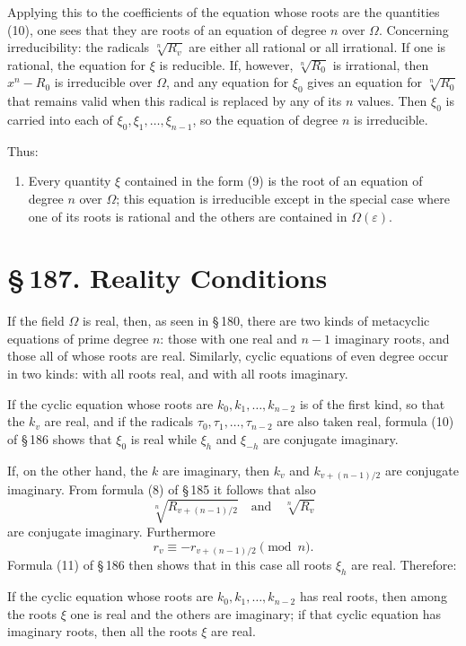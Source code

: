\documentclass[11pt]{article}
\providecommand{\sect}[2]{\section*{\S\,#1. #2}}
\begin{document}
Applying this to the coefficients of the equation whose roots are the quantities (10), one sees that they are roots of an equation of degree $n$ over $\Omega$. Concerning irreducibility: the radicals $\sqrt[n]{R_v}$ are either all rational or all irrational. If one is rational, the equation for $\xi$ is reducible. If, however, $\sqrt[n]{R_0}$ is irrational, then $x^n-R_0$ is irreducible over $\Omega$, and any equation for $\xi_0$ gives an equation for $\sqrt[n]{R_0}$ that remains valid when this radical is replaced by any of its $n$ values. Then $\xi_0$ is carried into each of $\xi_0,\xi_1,\ldots,\xi_{n-1}$, so the equation of degree $n$ is irreducible.

Thus:

\begin{enumerate}[resume,label=\Roman*.]
\item Every quantity $\xi$ contained in the form (9) is the root of an equation of degree $n$ over $\Omega$; this equation is irreducible except in the special case where one of its roots is rational and the others are contained in $\Omega(\varepsilon)$.
\end{enumerate}

\sect{187}{Reality Conditions}

If the field $\Omega$ is real, then, as seen in \S\,180, there are two kinds of metacyclic equations of prime degree $n$: those with one real and $n-1$ imaginary roots, and those all of whose roots are real. Similarly, cyclic equations of even degree occur in two kinds: with all roots real, and with all roots imaginary.

If the cyclic equation whose roots are $k_0,k_1,\ldots,k_{n-2}$ is of the first kind, so that the $k_v$ are real, and if the radicals $\tau_0,\tau_1,\ldots,\tau_{n-2}$ are also taken real, formula (10) of \S\,186 shows that $\xi_0$ is real while $\xi_h$ and $\xi_{-h}$ are conjugate imaginary.

If, on the other hand, the $k$ are imaginary, then $k_v$ and $k_{v+(n-1)/2}$ are conjugate imaginary. From formula (8) of \S\,185 it follows that also
\[
  \sqrt[n]{R_{v+(n-1)/2}}\quad\text{and}\quad \sqrt[n]{R_v}
\]
are conjugate imaginary. Furthermore
\[
  r_v\equiv -r_{v+(n-1)/2}\pmod n.
\]
Formula (11) of \S\,186 then shows that in this case all roots $\xi_h$ are real. Therefore:

If the cyclic equation whose roots are $k_0,k_1,\ldots,k_{n-2}$ has real roots, then among the roots $\xi$ one is real and the others are imaginary; if that cyclic equation has imaginary roots, then all the roots $\xi$ are real.
\end{document}
